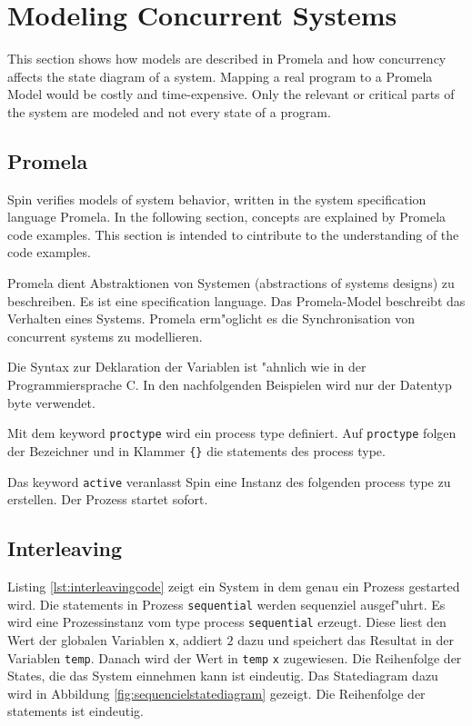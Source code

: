 \documentclass[11pt,twoside,a4paper]{article}
\begin{document}
\section{Modeling Concurrent Systems}
\label{sec:concurrency}

This section shows how models are described in Promela and how concurrency affects the state diagram of a system. Mapping a real program to a Promela Model would be costly and time-expensive. Only the relevant or critical parts of the system are modeled and not every state of a program.

\subsection{Promela}
\label{sec:promela}

Spin verifies models of system behavior, written in the system specification language Promela. In the following section, concepts are explained by Promela code examples. This section is intended to cintribute to the understanding of the code examples.

Promela dient Abstraktionen von Systemen (abstractions of systems designs) zu beschreiben. Es ist eine specification language. Das Promela-Model beschreibt das Verhalten eines Systems. Promela erm"oglicht es die Synchronisation von concurrent systems zu modellieren.

Die Syntax zur Deklaration der Variablen ist "ahnlich wie in der Programmiersprache C. In den nachfolgenden Beispielen wird nur der Datentyp byte verwendet.

Mit dem keyword \verb|proctype| wird ein process type definiert. Auf \verb|proctype| folgen der Bezeichner und in Klammer \verb|{}| die statements des process type. \cite{holzmann03}

Das keyword \verb|active| veranlasst Spin eine Instanz des folgenden process type zu erstellen. Der Prozess startet sofort. 

\subsection{Interleaving}
\label{sec:interleaving}

Listing \ref{lst:interleavingcode} zeigt ein System in dem genau ein Prozess gestarted wird. Die statements in Prozess \verb|sequential| werden sequenziel ausgef"uhrt. Es wird eine Prozessinstanz vom type process \verb|sequential| erzeugt. Diese liest den Wert der globalen Variablen \verb|x|, addiert $2$ dazu und speichert das Resultat in der Variablen \verb|temp|. Danach wird der Wert in \verb|temp| \verb|x| zugewiesen. Die Reihenfolge der States, die das System einnehmen kann ist eindeutig. Das Statediagram dazu wird in Abbildung \ref{fig:sequencielstatediagram} gezeigt. Die Reihenfolge der statements ist eindeutig.
\end{document}
